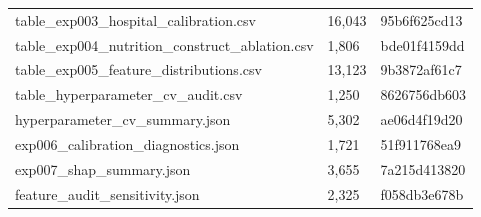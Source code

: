 \documentclass[11pt]{ctexart}
\begin{document}
\begin{table}[htbp]
\begin{tabular}{lll}
table\_exp003\_hospital\_calibration.csv & 16,043 & 95b6f625cd13\\
table\_exp004\_nutrition\_construct\_ablation.csv & 1,806 & bde01f4159dd\\
table\_exp005\_feature\_distributions.csv & 13,123 & 9b3872af61c7\\
table\_hyperparameter\_cv\_audit.csv & 1,250 & 8626756db603\\
hyperparameter\_cv\_summary.json & 5,302 & ae06d4f19d20\\
exp006\_calibration\_diagnostics.json & 1,721 & 51f911768ea9\\
exp007\_shap\_summary.json & 3,655 & 7a215d413820\\
feature\_audit\_sensitivity.json & 2,325 & f058db3e678b\\
\bottomrule
\end{tabular}
\end{table}
\end{document}
